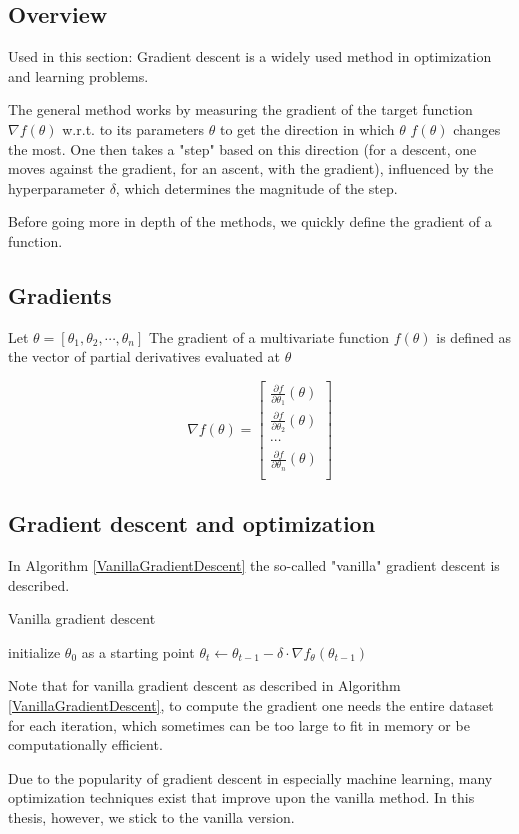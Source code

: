 \subsection{Overview}
Used in this section: \cite{R17}
Gradient descent is a widely used method in optimization and learning problems.

The general method works by measuring the gradient of the target function $\nabla f (\theta) $ w.r.t. to its parameters $\theta$ to get the direction 
in which $\theta$ $f(\theta)$ changes the most. 
One then takes a "step" based on this direction (for a descent, one moves against the gradient, for an ascent, with the gradient), 
influenced by the hyperparameter $\delta$, which determines the magnitude of the step.

Before going more in depth of the methods, we quickly define the gradient of a function.
\subsection{Gradients}
Let $\theta = [\theta_1, \theta_2, \cdots, \theta_n]$
The gradient of a multivariate function $f(\theta)$ is defined as the vector of partial derivatives evaluated at $\theta$

\[ \nabla f(\theta) = 
\begin{bmatrix}
\frac{\partial f}{\partial \theta_1}(\theta) \\
\frac{\partial f}{\partial \theta_2}(\theta) \\
\cdots \\
\frac{\partial f}{\partial \theta_n}(\theta) \\
\end{bmatrix}
\]

\subsection{Gradient descent and optimization}
In Algorithm \ref{VanillaGradientDescent} the so-called "vanilla" gradient descent is described.
\begin{algorithm}[H]
    \caption{Vanilla gradient descent} \label{VanillaGradientDescent}
\begin{algorithmic}[1]
    \State initialize $\theta_0$ as a starting point
    \State $\theta_t \gets \theta_{t-1} - \delta \cdot \nabla f_{\theta} (\theta_{t-1})$
    \EndWhile
\end{algorithmic}
\end{algorithm}

Note that for vanilla gradient descent as described in Algorithm \ref{VanillaGradientDescent}, to compute the gradient one needs the entire dataset for each iteration,
which sometimes can be too large to fit in memory or be computationally efficient.

Due to the popularity of gradient descent in especially machine learning, many optimization techniques exist that improve upon the vanilla method.
In this thesis, however, we stick to the vanilla version.
